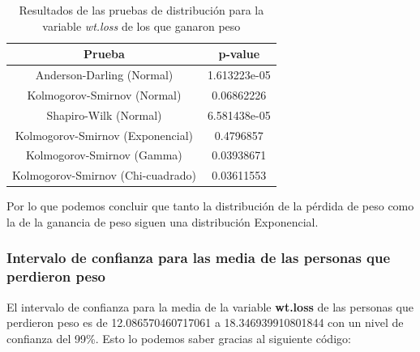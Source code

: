 \documentclass[a4paper,12pt]{article}
\begin{document}
\begin{table}[h!]
    \centering
    \begin{tabular}{|c|c|}
        \hline
        \textbf{Prueba} & \textbf{p-value} \\
        \hline
        Anderson-Darling (Normal) & 1.613223e-05 \\
        \hline
        Kolmogorov-Smirnov (Normal) & 0.06862226 \\
        \hline
        Shapiro-Wilk (Normal) & 6.581438e-05 \\
        \hline
        Kolmogorov-Smirnov (Exponencial) & 0.4796857 \\
        \hline
        Kolmogorov-Smirnov (Gamma) & 0.03938671 \\
        \hline
        Kolmogorov-Smirnov (Chi-cuadrado) & 0.03611553 \\
        \hline
    \end{tabular}
    \caption{Resultados de las pruebas de distribución para la variable \textit{wt.loss} de los que ganaron peso}
    \label{tab:pruebas_distribucion_wt_loss_GANANCIA}
\end{table}

Por lo que podemos concluir que tanto la distribución de la pérdida de peso como la de la ganancia de peso siguen una distribución Exponencial.

\subsubsection*{Intervalo de confianza para las media de las personas que perdieron peso}

El intervalo de confianza para la media de la variable \textbf{wt.loss} de las personas que perdieron peso es de 12.086570460717061 a 18.346939910801844 con un nivel de confianza del 99\%. Esto lo podemos saber gracias al siguiente código:
\end{document}
